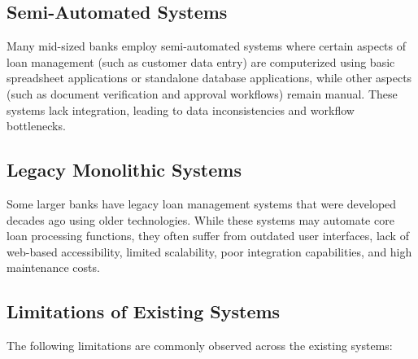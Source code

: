 \documentclass[12pt,a4paper,oneside]{report}
\begin{document}
\subsection{Semi-Automated Systems}

Many mid-sized banks employ semi-automated systems where certain aspects of loan management (such as customer data entry) are computerized using basic spreadsheet applications or standalone database applications, while other aspects (such as document verification and approval workflows) remain manual. These systems lack integration, leading to data inconsistencies and workflow bottlenecks.

\subsection{Legacy Monolithic Systems}

Some larger banks have legacy loan management systems that were developed decades ago using older technologies. While these systems may automate core loan processing functions, they often suffer from outdated user interfaces, lack of web-based accessibility, limited scalability, poor integration capabilities, and high maintenance costs.

\subsection{Limitations of Existing Systems}

The following limitations are commonly observed across the existing systems:
\end{document}
